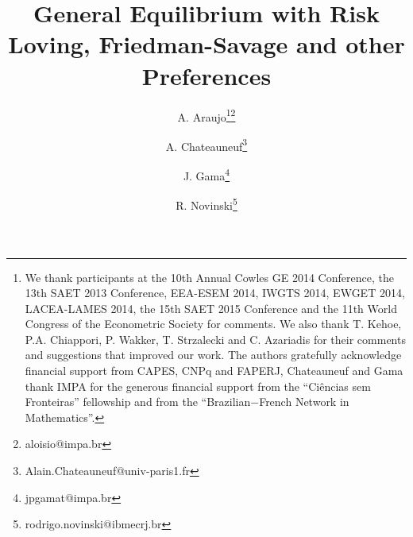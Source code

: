 \documentclass[pdftex]{article}
\numberwithin{equation}{section}
\theoremstyle{th}
\newtheorem{proof lemma}{{Proof Lemma}.}
\theoremstyle{definition}
\newtheorem*{risk lovers}{Risk lovers}
\newtheorem*{risk averse}{Risk averse}
\begin{document}
\title{General Equilibrium with Risk Loving, Friedman-Savage and other Preferences}
\author[1,2]{A. Araujo\thanks{We thank participants at the 10th Annual Cowles GE 2014 Conference, the 13th SAET 2013 Conference, EEA-ESEM 2014, IWGTS 2014, EWGET 2014, LACEA-LAMES 2014, the 15th SAET 2015 Conference and the 11th World Congress of the Econometric Society for comments. We also thank T. Kehoe, P.A. Chiappori, P. Wakker, T. Strzalecki and C. Azariadis for their comments and suggestions that improved our work. The authors gratefully acknowledge financial support from CAPES, CNPq and FAPERJ, Chateauneuf and Gama thank IMPA for the generous financial support from the ``Ci\^{e}ncias sem Fronteiras'' fellowship and from the ``Brazilian$-$French Network in Mathematics''.}\thanks{aloisio@impa.br}}
\author[3]{A. Chateauneuf\thanks{Alain.Chateauneuf@univ-paris1.fr}}
\author[1]{J. Gama\thanks{jpgamat@impa.br}}
\author[4]{R. Novinski\thanks{rodrigo.novinski@ibmecrj.br}}
\end{document}
